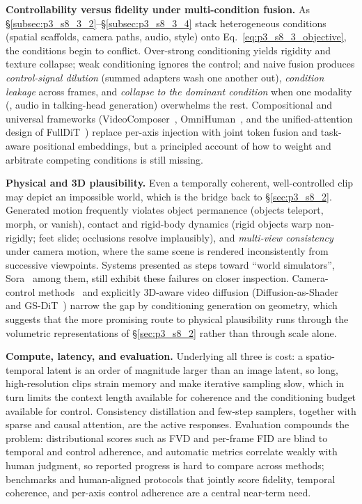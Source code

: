 \noindent\textbf{Controllability versus fidelity under multi-condition fusion.} As §\ref{subsec:p3_s8_3_2}--§\ref{subsec:p3_s8_3_4} stack heterogeneous conditions (spatial scaffolds, camera paths, audio, style) onto Eq.~\eqref{eq:p3_s8_3_objective}, the conditions begin to conflict. Over-strong conditioning yields rigidity and texture collapse; weak conditioning ignores the control; and naive fusion produces \emph{control-signal dilution} (summed adapters wash one another out), \emph{condition leakage} across frames, and \emph{collapse to the dominant condition} when one modality (\eg, audio in talking-head generation) overwhelms the rest. Compositional and universal frameworks (VideoComposer~\cite{wang2023videocomposercompositionalvideosynthesis}, OmniHuman~\cite{lin2025omnihuman1rethinkingscalinguponestage}, and the unified-attention design of FullDiT~\cite{ju2025fullditmultitaskvideogenerative}) replace per-axis injection with joint token fusion and task-aware positional embeddings, but a principled account of how to weight and arbitrate competing conditions is still missing.

\noindent\textbf{Physical and 3D plausibility.} Even a temporally coherent, well-controlled clip may depict an impossible world, which is the bridge back to §\ref{sec:p3_s8_2}. Generated motion frequently violates object permanence (objects teleport, morph, or vanish), contact and rigid-body dynamics (rigid objects warp non-rigidly; feet slide; occlusions resolve implausibly), and \emph{multi-view consistency} under camera motion, where the same scene is rendered inconsistently from successive viewpoints. Systems presented as steps toward ``world simulators'', Sora~\cite{sora2024} among them, still exhibit these failures on closer inspection. Camera-control methods~\cite{he2024cameractrl,yu2024viewcrafter} and explicitly 3D-aware video diffusion (Diffusion-as-Shader~\cite{gu2025diffusionshader3dawarevideo} and GS-DiT~\cite{bian2025gsditadvancingvideogeneration}) narrow the gap by conditioning generation on geometry, which suggests that the more promising route to physical plausibility runs through the volumetric representations of §\ref{sec:p3_s8_2} rather than through scale alone.

\noindent\textbf{Compute, latency, and evaluation.} Underlying all three is cost: a spatio-temporal latent is an order of magnitude larger than an image latent, so long, high-resolution clips strain memory and make iterative sampling slow, which in turn limits the context length available for coherence and the conditioning budget available for control. Consistency distillation and few-step samplers, together with sparse and causal attention, are the active responses. Evaluation compounds the problem: distributional scores such as FVD and per-frame FID are blind to temporal and control adherence, and automatic metrics correlate weakly with human judgment, so reported progress is hard to compare across methods; benchmarks and human-aligned protocols that jointly score fidelity, temporal coherence, and per-axis control adherence are a central near-term need.

